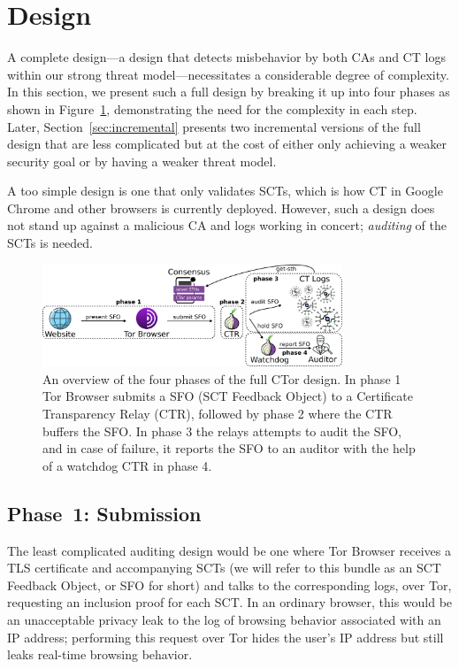 \section{Design} \label{sec:base}

A complete design---a design that detects misbehavior by both CAs and CT logs
within our strong threat model---necessitates a considerable degree of
complexity. In this section, we present such a full design by breaking it up
into four phases as shown in Figure~\ref{fig:design}, demonstrating the need for
the complexity in each step. Later, Section~\ref{sec:incremental} presents two
incremental versions of the full design that are less complicated but at the
cost of either only achieving a weaker security goal or by having a weaker
threat model.

A too simple design is one that only validates SCTs, which is how CT in Google
Chrome and other browsers is currently deployed. However, such a design does not
stand up against a malicious CA and logs working in concert; \emph{auditing} of
the SCTs is needed.

\begin{figure}
    \centering
	\includegraphics[width=0.8\textwidth]{img/design}
	\vspace{-8px}
	\caption{%
		An overview of the four phases of the full CTor design. In phase 1 Tor
	Browser submits a SFO (SCT Feedback Object) to a Certificate Transparency
	Relay (CTR), followed by phase 2 where the CTR buffers the SFO. In phase 3
	the relays attempts to audit the SFO, and in case of failure, it reports the
	SFO to an auditor with the help of a watchdog CTR in phase 4.}
	\label{fig:design}
	\vspace{-10px}
\end{figure}

\subsection{Phase~1: Submission} \label{sec:base:phase1}

The least complicated auditing design would be one where Tor Browser receives a
TLS certificate and accompanying SCTs (we will refer to this bundle as an SCT
Feedback Object, or SFO for short) and talks to the corresponding logs, over
Tor, requesting an inclusion proof for each SCT. In an ordinary browser, this
would be an unacceptable privacy leak to the log of browsing behavior associated
with an IP address; performing this request over Tor hides the user's IP address
but still leaks real-time browsing behavior.

